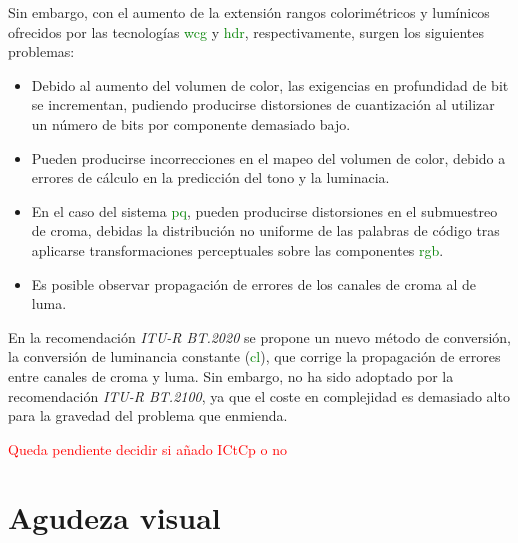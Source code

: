 \documentclass[a4paper, 12pt]{report}
\begin{document}
Sin embargo, con el aumento de la extensión rangos colorimétricos y lumínicos ofrecidos por las tecnologías \textcolor{green}{wcg} y \textcolor{green}{hdr}, respectivamente, surgen los siguientes problemas:

\begin{itemize}
  \item Debido al aumento del volumen de color, las exigencias en profundidad de bit se incrementan, pudiendo producirse        distorsiones de cuantización al utilizar un número de bits por componente demasiado bajo.
  \item Pueden producirse incorrecciones en el mapeo  del volumen de color, debido a errores de cálculo en la predicción        del tono y la luminacia.
  \item En el caso del sistema \textcolor{green}{pq}, pueden producirse distorsiones en el submuestreo de croma, debidas la distribución no uniforme de las palabras de código tras aplicarse transformaciones perceptuales sobre las componentes \textcolor{green}{rgb}.
  \item Es posible observar propagación de errores de los canales de croma al de luma.
\end{itemize}

  En la recomendación \textit{ITU-R BT.2020} se propone un nuevo método de conversión, la conversión de luminancia constante (\textcolor{green}{cl}), que corrige la propagación de errores entre canales de croma y luma. Sin embargo, no ha sido adoptado por la recomendación \textit{ITU-R BT.2100}, ya que el coste en complejidad es demasiado alto para la gravedad del problema que  enmienda.
  
  \textcolor{red}{Queda pendiente decidir si añado ICtCp o no}


\section{Agudeza visual}
\label{sec:agudeza_visual}
 
\end{document}
